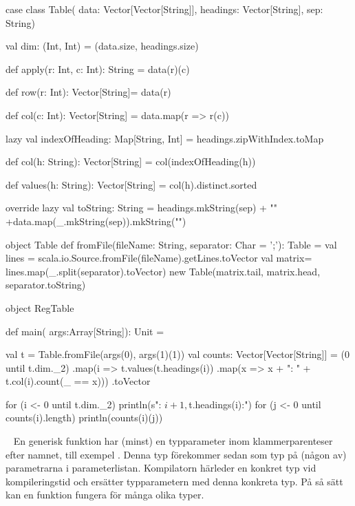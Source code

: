 \SubtaskSolved  \begin{CodeSmall}
case class Table(
	data: Vector[Vector[String]],
	headings: Vector[String],
	sep: String){

	val dim: (Int, Int) = (data.size, headings.size)

	def apply(r: Int, c: Int): String = data(r)(c)

	def row(r: Int): Vector[String]= data(r)

	def col(c: Int): Vector[String] = data.map(r => r(c))

	lazy val indexOfHeading: Map[String, Int] = headings.zipWithIndex.toMap

	def col(h: String): Vector[String] = col(indexOfHeading(h))

	def values(h: String): Vector[String] = col(h).distinct.sorted

	override lazy val toString: String =
		headings.mkString(sep) + "\n" +data.map(_.mkString(sep)).mkString("\n")
}
object Table {
	def fromFile(fileName: String, separator: Char = ';'): Table = {
		val lines = scala.io.Source.fromFile(fileName).getLines.toVector
		val matrix= lines.map(_.split(separator).toVector)
		new Table(matrix.tail, matrix.head, separator.toString)
	}
}
\end{CodeSmall}

\SubtaskSolved  \begin{CodeSmall}
object RegTable {
 	def main( args:Array[String]): Unit = {
		val t = Table.fromFile(args(0), args(1)(1))
		val counts: Vector[Vector[String]] =
 			(0 until t.dim._2)
				.map(i => t.values(t.headings(i))
				.map(x => x + ": " + t.col(i).count(_ == x)))
				.toVector

    for (i <- 0 until t.dim._2) {
      println(s"\nColumn: ${i + 1}, ${t.headings(i)}:")
      for (j <- 0 until counts(i).length) {
        println(counts(i)(j))
      }
    }
  }
}
\end{CodeSmall}



\QUESTEND









\QUESTBEGIN

\Task  \what~  En generisk funktion har (minst) en typparameter inom klammerparenteser efter namnet, till exempel \code{[T]}. Denna typ förekommer sedan som typ på (någon av) parametrarna i parameterlistan. Kompilatorn härleder en konkret typ vid kompileringstid och ersätter typparametern med denna konkreta typ. På så sätt kan en funktion fungera för många olika typer.

